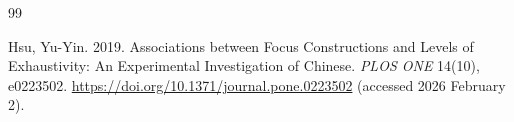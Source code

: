 \documentclass[ruler]{CUP-JNL-LIN}%
\begin{document}
\begin{Backmatter}
\begin{thebibliography}{99}

{Hsu, Yu-Yin}. 2019. Associations between Focus Constructions and Levels of Exhaustivity: An Experimental Investigation of Chinese. \textit{PLOS ONE} 14(10), e0223502. \url{https://doi.org/10.1371/journal.pone.0223502}  (accessed 2026 February 2).




\end{thebibliography}
\end{Backmatter}
\end{document}
